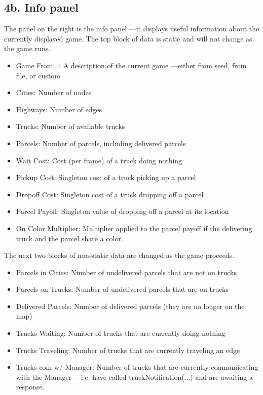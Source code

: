 \documentclass[11pt]{article}
\begin{document}
\subsection{4b. Info panel}
The panel on the right is the info panel ---it displays useful information about the currently displayed game.
The top block of data is static and will not change as the game runs.
\begin{itemize}
\item Game From...: A description of the current game ---either from seed, from file, or custom
\item Cities: Number of nodes
\item Highways: Number of edges
\item Trucks:  Number of available trucks
\item Parcels:  Number of parcels, including delivered parcels
\item Wait Cost: Cost (per frame) of a truck doing nothing
\item Pickup Cost: Singleton cost of a truck picking up a parcel
\item Dropoff Cost: Singleton cost of a truck dropping off a parcel
\item Parcel Payoff: Singleton value of dropping off a parcel at its location
\item On Color Multiplier: Multiplier applied to the parcel payoff if the delivering truck and the parcel share a color.
\end{itemize}

The next two blocks of non-static data are changed as the game proceeds.

\begin{itemize}
\item Parcels in Cities: Number of undelivered parcels that are not on trucks
\item Parcels on Trucks: Number of undelivered parcels that are on trucks
\item Delivered Parcels: Number of delivered parcels (they are no longer on the map)
\item Trucks Waiting: Number of trucks that are currently doing nothing
\item Trucks Traveling: Number of trucks that are currently traveling an edge
\item Trucks com w/ Manager: Number of trucks that are currently communicating with the Manager —i.e. have called truckNotification(...) and are awaiting a response.
\end{itemize}
\end{document}
